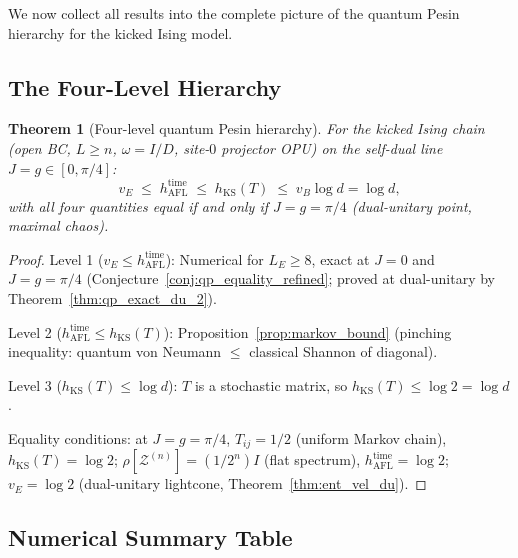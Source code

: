 \documentclass[12pt,a4paper]{article}
\newtheorem{theorem}{Theorem}[section]
\begin{document}
We now collect all results into the complete picture of the quantum
Pesin hierarchy for the kicked Ising model.

\subsection{The Four-Level Hierarchy}
\label{subsec:four_level}

\begin{theorem}[Four-level quantum Pesin hierarchy]
  \label{thm:four_level}
  For the kicked Ising chain (open BC, $L \geq n$, $\omega = I/D$,
  site-$0$ projector OPU) on the self-dual line $J = g \in [0,\pi/4]$:
  \begin{equation}
    \label{eq:four_level}
    v_E
    \;\leq\; h_{\mathrm{AFL}}^{\mathrm{time}}
    \;\leq\; h_{\mathrm{KS}}(T)
    \;\leq\; v_B \log d = \log d,
  \end{equation}
  with all four quantities equal if and only if $J = g = \pi/4$
  (dual-unitary point, maximal chaos).
\end{theorem}

\begin{proof}
  Level 1 ($v_E \leq h_{\mathrm{AFL}}^{\mathrm{time}}$): Numerical
  for $L_E \geq 8$, exact at $J = 0$ and $J=g=\pi/4$
  (Conjecture~\ref{conj:qp_equality_refined}; proved at dual-unitary by
  Theorem~\ref{thm:qp_exact_du_2}).

  Level 2 ($h_{\mathrm{AFL}}^{\mathrm{time}} \leq h_{\mathrm{KS}}(T)$):
  Proposition~\ref{prop:markov_bound} (pinching inequality: quantum
  von Neumann $\leq$ classical Shannon of diagonal).

  Level 3 ($h_{\mathrm{KS}}(T) \leq \log d$): $T$ is a stochastic
  matrix, so $h_{\mathrm{KS}}(T) \leq \log 2 = \log d$.

  Equality conditions: at $J = g = \pi/4$, $T_{ij} = 1/2$ (uniform
  Markov chain), $h_{\mathrm{KS}}(T) = \log 2$; $\rho[\mathcal{Z}^{(n)}]
  = (1/2^n)I$ (flat spectrum), $h_{\mathrm{AFL}}^{\mathrm{time}} = \log 2$;
  $v_E = \log 2$ (dual-unitary lightcone, Theorem~\ref{thm:ent_vel_du}).
\end{proof}

\subsection{Numerical Summary Table}
\label{subsec:final_table}
\end{document}
